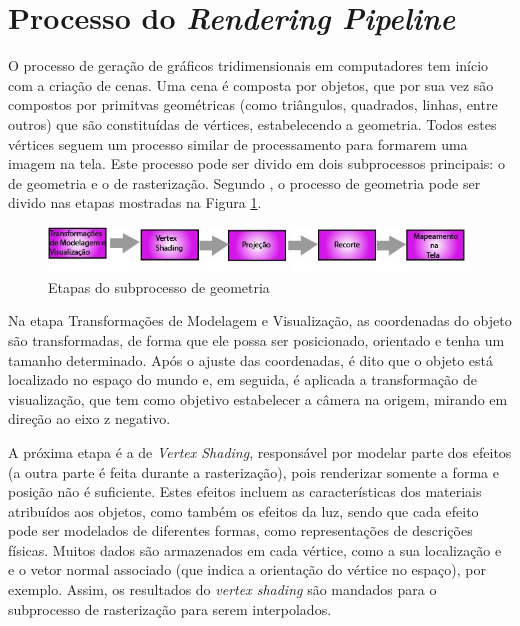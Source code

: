 \section{Processo do \textit{Rendering Pipeline}}
\label{renderpipe}


	O processo de geração de gráficos tridimensionais em computadores tem início com a criação de cenas. Uma cena é composta por objetos, que por sua vez são compostos por primitvas geométricas (como triângulos, quadrados, linhas, entre outros) que são constituídas de vértices, estabelecendo a geometria. Todos estes vértices seguem um processo similar de processamento para formarem uma imagem na tela.  Este processo pode ser divido em dois subprocessos principais: o de geometria e o de rasterização.  Segundo \cite{realtime}, o processo de geometria pode ser divido nas etapas mostradas na Figura \ref{geometria}.

	\begin{figure}[h]
	\centering
		\includegraphics[keepaspectratio=true,scale=0.7]{figuras/geometria.jpg}
	\caption{Etapas do subprocesso de geometria}
	\label{geometria}
	\end{figure}

	Na etapa Transformações de Modelagem e Visualização, as coordenadas do objeto são transformadas, de forma que ele possa ser posicionado, orientado e tenha um tamanho determinado. Após o ajuste das coordenadas, é dito que o objeto está localizado no espaço do mundo e, em seguida, é aplicada a transformação de visualização, que tem como objetivo estabelecer a câmera na origem, mirando em direção ao eixo z negativo. 

	A próxima etapa é a de \textit{Vertex Shading}, responsável por modelar parte dos efeitos (a outra parte é feita durante a rasterização), pois renderizar somente a forma e posição não é suficiente.  Estes efeitos incluem as características dos materiais atribuídos aos objetos, como também os efeitos da luz, sendo que cada efeito pode ser modelados de diferentes formas, como representações de descrições físicas. Muitos dados são armazenados em cada vértice, como a sua localização e e o vetor normal associado (que indica a orientação do vértice no espaço), por exemplo. Assim, os resultados do \textit{vertex shading} são mandados para o subprocesso de rasterização para serem interpolados. 

